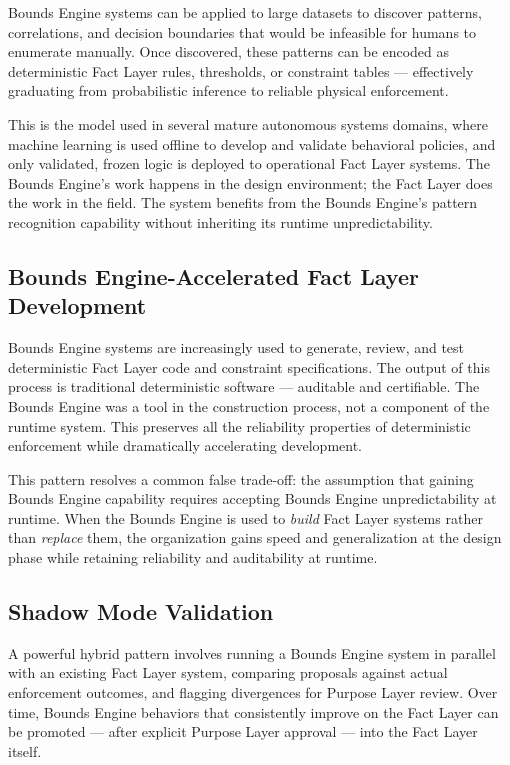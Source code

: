 \documentclass[12pt]{article}
\begin{document}
Bounds Engine systems can be applied to large datasets to discover patterns, correlations, and decision boundaries that would be infeasible for humans to enumerate manually. Once discovered, these patterns can be encoded as deterministic Fact Layer rules, thresholds, or constraint tables --- effectively graduating from probabilistic inference to reliable physical enforcement.

This is the model used in several mature autonomous systems domains, where machine learning is used offline to develop and validate behavioral policies, and only validated, frozen logic is deployed to operational Fact Layer systems. The Bounds Engine's work happens in the design environment; the Fact Layer does the work in the field. The system benefits from the Bounds Engine's pattern recognition capability without inheriting its runtime unpredictability.

\subsection{Bounds Engine-Accelerated Fact Layer Development}

Bounds Engine systems are increasingly used to generate, review, and test deterministic Fact Layer code and constraint specifications. The output of this process is traditional deterministic software --- auditable and certifiable. The Bounds Engine was a tool in the construction process, not a component of the runtime system. This preserves all the reliability properties of deterministic enforcement while dramatically accelerating development.

This pattern resolves a common false trade-off: the assumption that gaining Bounds Engine capability requires accepting Bounds Engine unpredictability at runtime. When the Bounds Engine is used to \textit{build} Fact Layer systems rather than \textit{replace} them, the organization gains speed and generalization at the design phase while retaining reliability and auditability at runtime.

\subsection{Shadow Mode Validation}

A powerful hybrid pattern involves running a Bounds Engine system in parallel with an existing Fact Layer system, comparing proposals against actual enforcement outcomes, and flagging divergences for Purpose Layer review. Over time, Bounds Engine behaviors that consistently improve on the Fact Layer can be promoted --- after explicit Purpose Layer approval --- into the Fact Layer itself.
\end{document}
